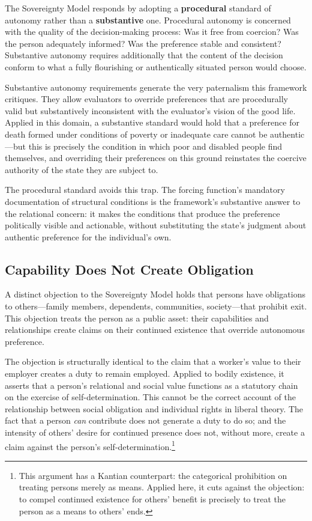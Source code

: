 \documentclass[11pt, letterpaper]{article}
\begin{document}
The Sovereignty Model responds by adopting a \textbf{procedural} standard of autonomy
rather than a \textbf{substantive} one. Procedural autonomy is concerned with the
quality of the decision-making process: Was it free from coercion? Was the person
adequately informed? Was the preference stable and consistent? Substantive autonomy
requires additionally that the content of the decision conform to what a fully flourishing
or authentically situated person would choose.

Substantive autonomy requirements generate the very paternalism this framework critiques.
They allow evaluators to override preferences that are procedurally valid but substantively
inconsistent with the evaluator's vision of the good life. Applied in this domain, a
substantive standard would hold that a preference for death formed under conditions of
poverty or inadequate care cannot be authentic---but this is precisely the condition in
which poor and disabled people find themselves, and overriding their preferences on this
ground reinstates the coercive authority of the state they are subject to.

The procedural standard avoids this trap. The forcing function's mandatory documentation
of structural conditions is the framework's substantive answer to the relational concern:
it makes the conditions that produce the preference politically visible and actionable,
without substituting the state's judgment about authentic preference for the individual's
own.

\subsection{Capability Does Not Create Obligation}

A distinct objection to the Sovereignty Model holds that persons have obligations to
others---family members, dependents, communities, society---that prohibit exit. This
objection treats the person as a public asset: their capabilities and relationships
create claims on their continued existence that override autonomous preference.

The objection is structurally identical to the claim that a worker's value to their
employer creates a duty to remain employed. Applied to bodily existence, it asserts
that a person's relational and social value functions as a statutory chain on the
exercise of self-determination. This cannot be the correct account of the relationship
between social obligation and individual rights in liberal theory. The fact that a
person \textit{can} contribute does not generate a duty to do so; and the intensity
of others' desire for continued presence does not, without more, create a claim against
the person's self-determination.\footnote{%
  This argument has a Kantian counterpart: the categorical prohibition on treating
  persons merely as means. Applied here, it cuts against the objection: to compel
  continued existence for others' benefit is precisely to treat the person as a means
  to others' ends.}
\end{document}
